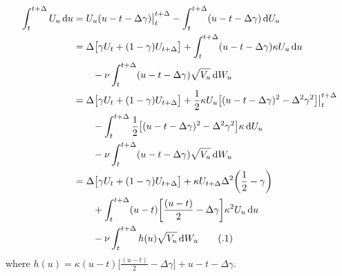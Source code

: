 \documentclass{ws-ijfe}
\newcommand\numberthis{\addtocounter{equation}{1}\tag{\theequation}}
\begin{document}
\begin{align*}
  \int_{t}^{t+\Delta}U_u\,\d u %
   & = U_u(u-t-\Delta\gamma)\big|_t^{t+\Delta}-\int_{t}^{t+\Delta}(u-t-\Delta\gamma)\,\d U_u \\
   & = \Delta\big[\gamma U_t+(1-\gamma ) U_{t+\Delta}\big]+\int_{t}^{t+\Delta}(u-t-\Delta\gamma )\kappa U_u\,\d u\\
   &\quad\quad-\nu\int_{t}^{t+\Delta}(u-t-\Delta\gamma )\sqrt{V_u}\,\d W_u\\%
   & = \Delta\big[\gamma U_t+(1-\gamma ) U_{t+\Delta}\big]+\frac{1}{2}\kappa U_{u}\big[{(u-t-\Delta\gamma )^2}-{\Delta^2\gamma ^2}\big]\big|_t^{t+\Delta}\\
   &\quad\quad- \int_{t}^{t+\Delta}\frac{1}{2}\big[(u-t-\Delta\gamma )^2-\Delta^2\gamma ^2\big] \kappa\,\d U_u\\
   &\quad\quad-\nu\int_{t}^{t+\Delta}(u-t-\Delta\gamma )\sqrt{V_u}\,\d W_u\\
   & = \Delta\big[\gamma U_t+(1-\gamma ) U_{t+\Delta}\big]+\kappa U_{t+\Delta}\Delta^2\bigg(\frac{1}{2}-\gamma \bigg)\\
   &\quad\quad+\int_{t}^{t+\Delta}(u-t)\bigg[\frac{(u-t)}{2}-\Delta\gamma \bigg]\kappa^2U_u\,\d u\\
   &\quad\quad-\nu\int_{t}^{t+\Delta}h(u)\sqrt{V_u}\,\d W_u\numberthis\label{appeqnU_t}
\end{align*}
where $h(u) =\kappa(u-t)\big[\frac{(u-t)}{2}-\Delta\gamma \big]+u-t-\Delta\gamma$.
\end{document}
